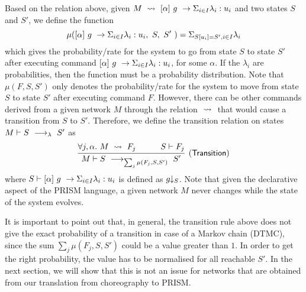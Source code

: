 Based on the relation above, given
$M\ \stackrel{}{\rightsquigarrow}\ [\alpha]\ g\ \rightarrow \Sigma_{i\in I}\lambda_i: u_i$ and two
states $S$ and $S'$, we define the function
$$\mu([\alpha]\ g\ \rightarrow \Sigma_{i\in I}\lambda_i: u_i,\ S,\ S'\ ) = \Sigma_{S[u_i]=S',i\in I}\lambda_i$$
which gives the probability/rate for the system to go from state $S$
to state $S'$ after executing command $[\alpha]\ g\ \rightarrow \Sigma_{i\in I}\lambda_i: u_i$,
for some $\alpha$.
%
If the $\lambda_i$ are probabilities, then the function must be a
probability distribution. Note that $\mu(F,S,S')$ only denotes the
probability/rate for the system to move from state $S$ to state $S'$
after executing command $F$. However, there can be other commands
derived from a given network $M$ through the relation $\ \stackrel{}{\rightsquigarrow}\ $
that would cause a transition from $S$ to $S'$. Therefore, we define
the transition relation on states $M\vdash S\ \longrightarrow_{\lambda}\ S'$ as
$$
\infer[\mathsf{(Transition)}]
{
  M\vdash S\red{\sum_{j} \mu(F_j,S,S')}S'
}
{
  \forall j,\alpha.\ M\prismred{}F_j
  \quad&\quad
  S\vdash F_j
}
$$
where $S\vdash [\alpha]\ g\ \rightarrow \Sigma_{i\in I}\lambda_i: u_i$ is defined as $g\!\!\downarrow_{S}$.
Note that given the declarative aspect of the PRISM language, a given
network $M$ never changes while the state of the system evolves.

It is important to point out that, in general, the transition rule
above does not give the exact probability of a transition in case of a
Markov chain (DTMC), since the sum ${\sum_{j} \mu(F_j,S,S')}$ could be
a value greater than $1$. In order to get the right probability, the
value has to be normalised for all reachable $S'$. In the next
section, we will show that this is not an issue for networks that are
obtained from our translation from choreography to PRISM.


